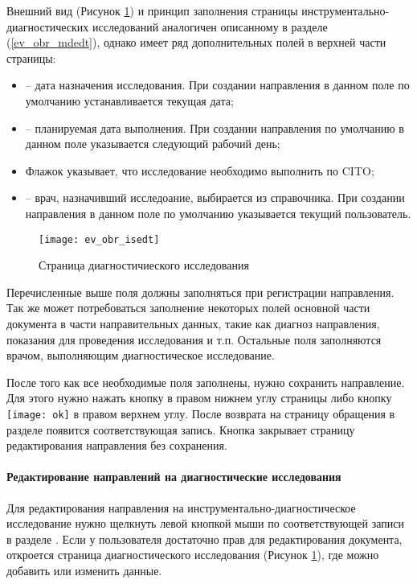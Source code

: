 Внешний вид (Рисунок \ref{img_ev_obr_isedt}) и принцип заполнения страницы инструментально-диагностических исследований аналогичен описанному в разделе (\ref{ev_obr_mdedt}), однако имеет ряд дополнительных полей в верхней части страницы:

\begin{itemize}
 \item {} -- дата назначения исследования. При создании направления в данном поле по умолчанию устанавливается текущая дата;
 \item {} -- планируемая дата выполнения. При создании направления по умолчанию в данном поле указывается следующий рабочий день;
 \item Флажок  указывает, что исследование необходимо выполнить по CITO;
 \item {} -- врач, назначивший исследоание, выбирается из справочника. При создании направления в данном поле по умолчанию указывается текущий пользователь.  
\end{itemize}

 \begin{figure}[ht]\centering
   \texttt{[image: ev\_obr\_isedt]}
   \caption{Страница диагностичиеского исследования}
   \label{img_ev_obr_isedt}
 \end{figure}  
 
Перечисленные выше поля должны заполняться при регистрации направления. Так же может потребоваться заполнение некоторых полей основной части документа в части направительных данных, такие как диагноз направления, показания для проведения исследования и т.п. Остальные поля заполняются врачом, выполняющим диагностическое исследование.

После того как все необходимые поля заполнены, нужно сохранить направление. Для этого нужно нажать кнопку  в правом нижнем углу страницы либо кнопку \texttt{[image: ok]} в правом верхнем углу. После возврата на страницу обращения в разделе  появится соответствующая запись. Кнопка  закрывает страницу редактирования направления без сохранения.

\paragraph{Редактирование направлений на диагностические исследования} \label{ev_obr_isedt}

Для редактирования направления на инструментально-диагностическое исследование нужно щелкнуть левой кнопкой мыши по соответствующей записи в разделе . Если у пользователя достаточно прав для редактирования документа, откроется страница диагностического исследования (Рисунок \ref{img_ev_obr_isedt}), где можно добавить или изменить данные.

